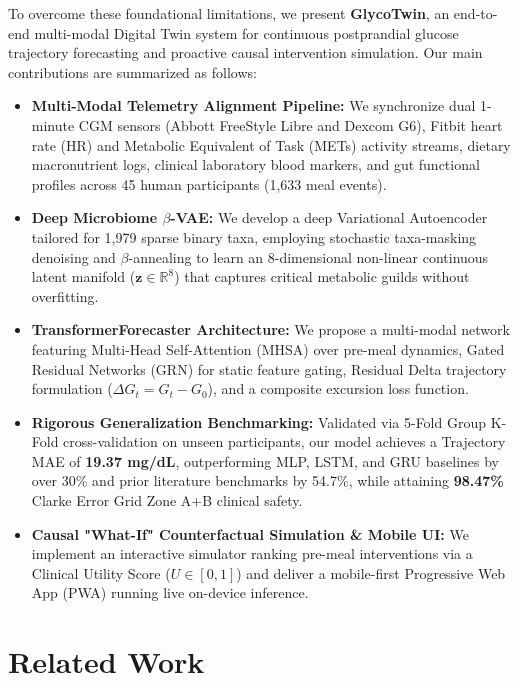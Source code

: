 \documentclass[conference]{IEEEtran}
\begin{document}
To overcome these foundational limitations, we present \textbf{GlycoTwin}, an end-to-end multi-modal Digital Twin system for continuous postprandial glucose trajectory forecasting and proactive causal intervention simulation. Our main contributions are summarized as follows:
\begin{itemize}
    \item \textbf{Multi-Modal Telemetry Alignment Pipeline:} We synchronize dual 1-minute CGM sensors (Abbott FreeStyle Libre and Dexcom G6), Fitbit heart rate (HR) and Metabolic Equivalent of Task (METs) activity streams, dietary macronutrient logs, clinical laboratory blood markers, and gut functional profiles across 45 human participants (1,633 meal events).
    \item \textbf{Deep Microbiome $\beta$-VAE:} We develop a deep Variational Autoencoder tailored for 1,979 sparse binary taxa, employing stochastic taxa-masking denoising and $\beta$-annealing to learn an 8-dimensional non-linear continuous latent manifold ($\mathbf{z} \in \mathbb{R}^8$) that captures critical metabolic guilds without overfitting.
    \item \textbf{TransformerForecaster Architecture:} We propose a multi-modal network featuring Multi-Head Self-Attention (MHSA) over pre-meal dynamics, Gated Residual Networks (GRN) for static feature gating, Residual Delta trajectory formulation ($\Delta G_t = G_t - G_0$), and a composite excursion loss function.
    \item \textbf{Rigorous Generalization Benchmarking:} Validated via 5-Fold Group K-Fold cross-validation on unseen participants, our model achieves a Trajectory MAE of \textbf{19.37 mg/dL}, outperforming MLP, LSTM, and GRU baselines by over 30\% and prior literature benchmarks by 54.7\%, while attaining \textbf{98.47\%} Clarke Error Grid Zone A+B clinical safety.
    \item \textbf{Causal "What-If" Counterfactual Simulation \& Mobile UI:} We implement an interactive simulator ranking pre-meal interventions via a Clinical Utility Score ($U \in [0, 1]$) and deliver a mobile-first Progressive Web App (PWA) running live on-device inference.
\end{itemize}

\section{Related Work}
\end{document}
